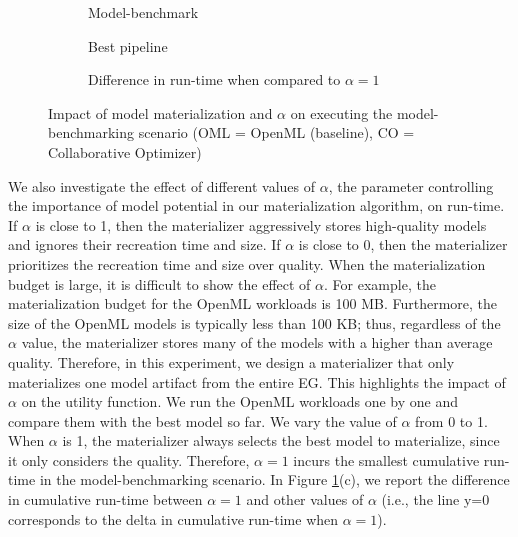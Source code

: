 \begin{figure}[t]
\begin{subfigure}[b]{0.5\linewidth}
\centering
 \resizebox{\columnwidth}{!}{%
%
}
\caption{Model-benchmark}
\end{subfigure}%
\begin{subfigure}[b]{0.5\linewidth}
\centering
 \resizebox{\columnwidth}{!}{%
%
}
\caption{Best pipeline}
\end{subfigure}
\begin{subfigure}[b]{\linewidth}
\centering
 \resizebox{\columnwidth}{!}{%
%
}
\caption{Difference in run-time when compared to $\alpha=1$}
\end{subfigure}
\caption{Impact of model materialization and $\alpha$ on executing the model-benchmarking scenario (OML = OpenML (baseline), CO = Collaborative Optimizer)}
\label{exp-model-materialization}
\end{figure}
We also investigate the effect of different values of $\alpha$, the parameter controlling the importance of model potential in our materialization algorithm, on run-time.
If $\alpha$ is close to 1, then the materializer aggressively stores high-quality models and ignores their recreation time and size.
If $\alpha$ is close to 0, then the materializer prioritizes the recreation time and size over quality.
When the materialization budget is large, it is difficult to show the effect of $\alpha$.
For example, the materialization budget for the OpenML workloads is 100 MB.
Furthermore, the size of the OpenML models is typically less than 100 KB; thus, regardless of the $\alpha$ value, the materializer stores many of the models with a higher than average quality.
Therefore, in this experiment, we design a materializer that only materializes one model artifact from the entire EG.
This highlights the impact of $\alpha$ on the utility function.
We run the OpenML workloads one by one and compare them with the best model so far.
We vary the value of $\alpha$ from 0 to 1.
When $\alpha$ is 1, the materializer always selects the best model to materialize, since it only considers the quality.
Therefore, $\alpha=1$ incurs the smallest cumulative run-time in the model-benchmarking scenario.
In Figure \ref{exp-model-materialization}(c), we report the difference in cumulative run-time between $\alpha=1$ and other values of $\alpha$ (i.e., the line y=0 corresponds to the delta in cumulative run-time when $\alpha=1$).
